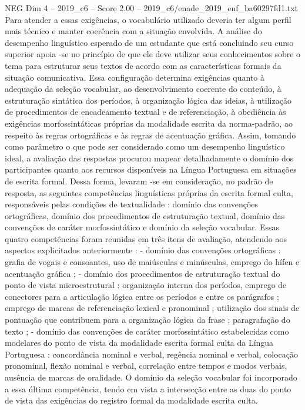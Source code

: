 \begin{textsample}{NEG Dim 4 – 2019\_c6 – Score 2.00 – 2019\_c6/enade\_2019\_enf\_ba60297fd1.txt}
Para atender a essas exigências, o vocabulário utilizado deveria ter algum perfil mais técnico e manter coerência com a situação envolvida.
A análise do desempenho linguístico esperado de um estudante que está concluindo seu curso superior apoia -se no princípio de que ele deve utilizar seus conhecimentos sobre o tema para estruturar seus textos de acordo com as características formais da situação comunicativa.
Essa configuração determina exigências quanto à adequação da seleção vocabular, ao desenvolvimento coerente do conteúdo, à estruturação sintática dos períodos, à organização lógica das ideias, à utilização de procedimentos de encadeamento textual e de referenciação, à obediência às exigências morfossintáticas próprias da modalidade escrita da norma-padrão, ao respeito às regras ortográficas e às regras de acentuação gráfica.
Assim, tomando como parâmetro o que pode ser considerado como um desempenho linguístico ideal, a avaliação das respostas procurou mapear detalhadamente o domínio dos participantes quanto aos recursos disponíveis na Língua Portuguesa em situações de escrita formal.
Dessa forma, levaram -se em consideração, no padrão de resposta, as seguintes competências linguísticas próprias da escrita formal culta, responsáveis pelas condições de textualidade : domínio das convenções ortográficas, domínio dos procedimentos de estruturação textual, domínio das convenções de caráter morfossintático e domínio da seleção vocabular.
Essas quatro competências foram reunidas em três itens de avaliação, atendendo aos aspectos explicitados anteriormente : - domínio das convenções ortográficas : grafia de vogais e consoantes, uso de maiúsculas e minúsculas, emprego do hífen e acentuação gráfica ; - domínio dos procedimentos de estruturação textual do ponto de vista microestrutural : organização interna dos períodos, emprego de conectores para a articulação lógica entre os períodos e entre os parágrafos ; emprego de marcas de referenciação lexical e pronominal ; utilização dos sinais de pontuação que contribuem para a organização lógica da frase ; paragrafação do texto ; - domínio das convenções de caráter morfossintático estabelecidas como modelares do ponto de vista da modalidade escrita formal culta da Língua Portuguesa : concordância nominal e verbal, regência nominal e verbal, colocação pronominal, flexão nominal e verbal, correlação entre tempos e modos verbais, ausência de marcas de oralidade.
O domínio da seleção vocabular foi incorporado a essa última competência, tendo em vista a intersecção entre as duas do ponto de vista das exigências do registro formal da modalidade escrita culta.

\end{textsample}

